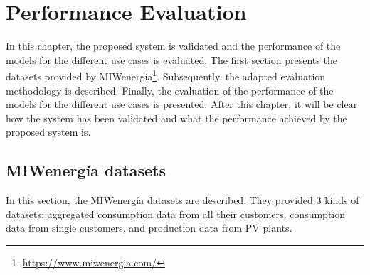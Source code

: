 \chapter{Performance Evaluation}
\label{cha:evaluation}
\vspace{0.4 cm}

In this chapter, the proposed system is validated and the performance of the models for the different use cases is evaluated.
The first section presents the datasets provided by MIWenergía\footnote{ \url{https://www.miwenergia.com/} }.
Subsequently, the adapted evaluation methodology is described.
Finally, the evaluation of the performance of the models for the different use cases is presented.
After this chapter, it will be clear how the system has been validated and what the performance achieved by the proposed system is.


\section{MIWenergía datasets}
\label{sec:datasets}
\vspace{0.2 cm}

In this section, the MIWenergía datasets are described.
They provided 3 kinds of datasets: aggregated consumption data from all their customers, consumption data from single customers, and production data from PV plants.

